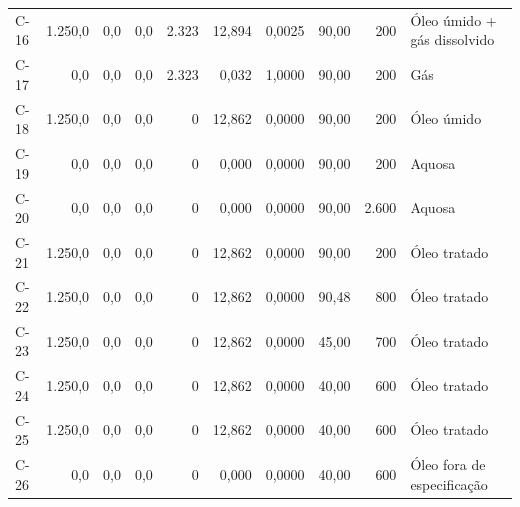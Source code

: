 \documentclass[11pt,a4paper]{article}
\numberwithin{equation}{section}
\numberwithin{table}{section}
\numberwithin{figure}{section}
\begin{document}
{\begin{longtable}{lrrrrrrrrL{2.5cm}}
C-16 & 1.250,0 & 0,0 & 0,0 & 2.323 & 12,894 & 0,0025 & 90,00 & 200 & {\scriptsize Óleo úmido + gás dissolvido}\\
C-17 & 0,0 & 0,0 & 0,0 & 2.323 & 0,032 & 1,0000 & 90,00 & 200 & {\scriptsize Gás}\\
C-18 & 1.250,0 & 0,0 & 0,0 & 0 & 12,862 & 0,0000 & 90,00 & 200 & {\scriptsize Óleo úmido}\\
C-19 & 0,0 & 0,0 & 0,0 & 0 & 0,000 & 0,0000 & 90,00 & 200 & {\scriptsize Aquosa}\\
C-20 & 0,0 & 0,0 & 0,0 & 0 & 0,000 & 0,0000 & 90,00 & 2.600 & {\scriptsize Aquosa}\\
C-21 & 1.250,0 & 0,0 & 0,0 & 0 & 12,862 & 0,0000 & 90,00 & 200 & {\scriptsize Óleo tratado}\\
C-22 & 1.250,0 & 0,0 & 0,0 & 0 & 12,862 & 0,0000 & 90,48 & 800 & {\scriptsize Óleo tratado}\\
C-23 & 1.250,0 & 0,0 & 0,0 & 0 & 12,862 & 0,0000 & 45,00 & 700 & {\scriptsize Óleo tratado}\\
C-24 & 1.250,0 & 0,0 & 0,0 & 0 & 12,862 & 0,0000 & 40,00 & 600 & {\scriptsize Óleo tratado}\\
C-25 & 1.250,0 & 0,0 & 0,0 & 0 & 12,862 & 0,0000 & 40,00 & 600 & {\scriptsize Óleo tratado}\\
C-26 & 0,0 & 0,0 & 0,0 & 0 & 0,000 & 0,0000 & 40,00 & 600 & {\scriptsize Óleo fora de especificação}\\
\bottomrule\end{longtable}}
\end{document}
